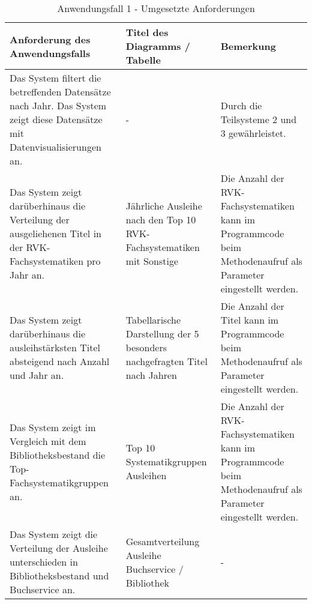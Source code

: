 \begingroup
    \setlength{\tabcolsep}{12pt} %
    \renewcommand{\arraystretch}{1.2} 
    \begin{table}[H]
        \large
        \centering
        \begin{adjustbox}{max width=\textwidth}
        \begin{tabular}{p{}p{}p{}}
           \toprule
           Anforderung des Anwendungsfalls        &Titel des Diagramms / Tabelle &Bemerkung\\
           \midrule
           Das System filtert die betreffenden Datensätze nach Jahr. Das System zeigt diese Datensätze mit Datenvisualisierungen an.&-&Durch die Teilsysteme 2  und 3 gewährleistet.\\
           Das System zeigt darüberhinaus die Verteilung der ausgeliehenen Titel in der RVK-Fachsystematiken pro Jahr an.&Jährliche Ausleihe nach den Top 10 RVK-Fachsystematiken mit Sonstige& Die Anzahl der RVK-Fachsystematiken kann im Programmcode beim Methodenaufruf als Parameter eingestellt werden.\\
           Das System zeigt darüberhinaus die ausleihstärksten Titel absteigend nach Anzahl und Jahr an.& Tabellarische Darstellung der 5 besonders nachgefragten Titel nach Jahren&Die Anzahl der Titel kann im Programmcode beim Methodenaufruf als Parameter eingestellt werden.\\
           Das System zeigt im Vergleich mit dem Bibliotheksbestand die Top-Fachsystematikgruppen an.&Top 10 Systematikgruppen Ausleihen\footnotemark&Die Anzahl der RVK-Fachsystematiken kann im Programmcode beim Methodenaufruf als Parameter eingestellt werden.\\
           Das System zeigt die Verteilung der Ausleihe unterschieden in Bibliotheksbestand und Buchservice an.&Gesamtverteilung Ausleihe Buchservice / Bibliothek&-\\
        \bottomrule
        \end{tabular}
        \end{adjustbox}
        \caption{%
            Anwendungsfall 1 - Umgesetzte Anforderungen
        }
        \label{tab:Anwendungsfall 1 - Umgesetzte Anforderungen}
        \end{table}


    \endgroup

